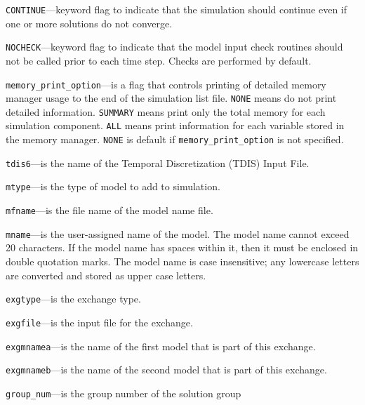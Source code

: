 
\item \texttt{CONTINUE}---keyword flag to indicate that the simulation should continue even if one or more solutions do not converge.

\item \texttt{NOCHECK}---keyword flag to indicate that the model input check routines should not be called prior to each time step. Checks are performed by default.

\item \texttt{memory\_print\_option}---is a flag that controls printing of detailed memory manager usage to the end of the simulation list file.  \texttt{NONE} means do not print detailed information. \texttt{SUMMARY} means print only the total memory for each simulation component. \texttt{ALL} means print information for each variable stored in the memory manager. \texttt{NONE} is default if \texttt{memory\_print\_option} is not specified.

\item \texttt{tdis6}---is the name of the Temporal Discretization (TDIS) Input File.

\item \texttt{mtype}---is the type of model to add to simulation.

\item \texttt{mfname}---is the file name of the model name file.

\item \texttt{mname}---is the user-assigned name of the model.  The model name cannot exceed 20 characters.  If the model name has spaces within it, then it must be enclosed in double quotation marks.  The model name is case insensitive; any lowercase letters are converted and stored as upper case letters.

\item \texttt{exgtype}---is the exchange type.

\item \texttt{exgfile}---is the input file for the exchange.

\item \texttt{exgmnamea}---is the name of the first model that is part of this exchange.

\item \texttt{exgmnameb}---is the name of the second model that is part of this exchange.

\item \texttt{group\_num}---is the group number of the solution group

